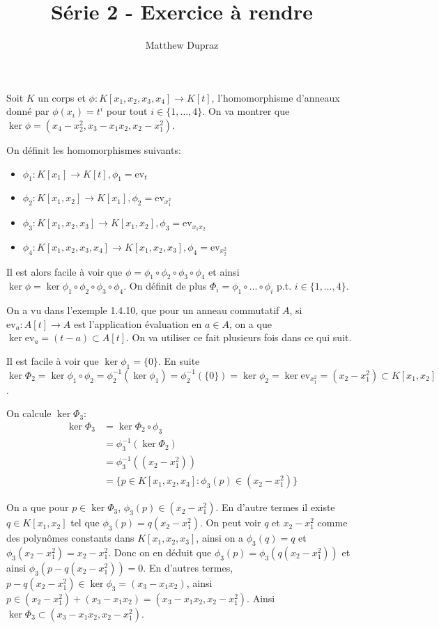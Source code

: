 \documentclass[french]{article}
\title{Série 2 - Exercice à rendre}
\author{Matthew Dupraz}
\newcommand{\ev}{\mathrm{ev}}
\begin{document}
\maketitle

Soit $K$ un corps et $\phi: K[x_1, x_2, x_3, x_4] \to K[t]$, l'homomorphisme
d'anneaux donné par $\phi (x_i) = t^i$ pour tout $i \in \{1, \dots, 4\}$.
On va montrer que $\ker \phi = (x_4 - x_2^2, x_3 - x_1x_2, x_2 - x_1^2)$.

On définit les homomorphismes suivants:
\begin{itemize}
	\item $\phi_1:K[x_1] \to K[t], \phi_1 = \ev_t$
	\item $\phi_2: K[x_1, x_2] \to K[x_1], \phi_2 = \ev_{x_1^2}$
	\item $\phi_3: K[x_1, x_2, x_3] \to K[x_1, x_2], \phi_3 = \ev_{x_1x_2}$
	\item $\phi_4: K[x_1, x_2, x_3, x_4] \to K[x_1, x_2, x_3],
		\phi_4 = \ev_{x_2^2}$
\end{itemize}

Il est alors facile à voir que $\phi = \phi_1 \circ \phi_2 \circ \phi_3 \circ
\phi_4$ et ainsi $\ker \phi = \ker \phi_1 \circ \phi_2 \circ \phi_3 \circ
\phi_4$. On définit de plus $\Phi_i = \phi_1 \circ \dots \circ \phi_i$ p.t.
$i \in \{1, \dots, 4\}$.

On a vu dans l'exemple 1.4.10, que pour un anneau commutatif
$A$, si $\ev_a: A[t] \to A$ est l'application évaluation en $a \in A$,
on a que $\ker\ev_a = (t - a) \subset A[t]$. On va utiliser ce fait plusieurs
fois dans ce qui suit.

Il est facile à voir que $\ker \phi_1 = \{0\}$.
En suite $\ker\Phi_2 = \ker\phi_1\circ\phi_2 =
\phi_2^{-1}(\ker\phi_1) = \phi_2^{-1}(\{0\})
= \ker\phi_2 = \ker\ev_{x_1^2} = (x_2 - x_1^2) \subset K[x_1, x_2]$. 

On calcule $\ker \Phi_3$:
\begin{align*}
	\ker\Phi_3 &= \ker \Phi_2\circ\phi_3\\
	&= \phi_3^{-1}(\ker\Phi_2)\\
	&= \phi_3^{-1}((x_2 - x_1^2))\\
	&= \{p \in K[x_1, x_2, x_3]: \phi_3(p) \in (x_2 - x_1^2)\}
\end{align*}

On a que pour $p \in \ker \Phi_3$,
$\phi_3(p) \in (x_2 - x_1^2)$. En d'autre termes il existe $q \in K[x_1, x_2]$
tel que $\phi_3(p) = q(x_2 - x_1^2)$. On peut voir $q$ et
$x_2 - x_1^2$ comme des polynômes constants dans $K[x_1, x_2, x_3]$, ainsi on a
$\phi_3(q) = q$ et $\phi_3(x_2 - x_1^2) = x_2 - x_1^2$.
Donc on en déduit que $\phi_3(p) = \phi_3(q(x_2- x_1^2))$ et ainsi
$\phi_3(p - q(x_2 - x_1^2)) = 0$.
En d'autres termes, $p - q(x_2 - x_1^2) \in \ker\phi_3 = (x_3 - x_1 x_2)$, 
ainsi $p \in (x_2 - x_1^2) + (x_3 - x_1x_2) = (x_3 - x_1x_2, x_2 - x_1^2)$.
Ainsi $\ker \Phi_3 \subset (x_3 - x_1x_2, x_2 - x_1^2)$.
\end{document}
